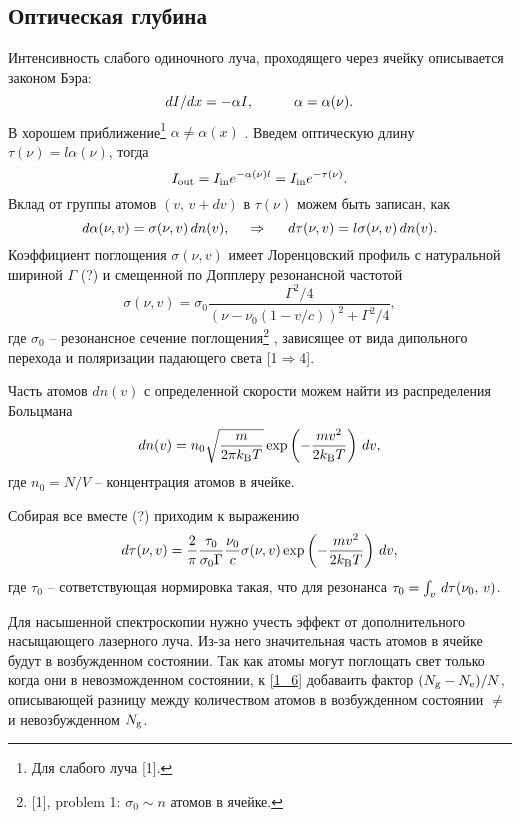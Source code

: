 \subsection{Оптическая глубина}


Интенсивность слабого одиночного луча, проходящего через ячейку описывается законом Бэра:
\begin{equation*}
    d I / d x = - \alpha I,
    \hspace{10 mm} 
    \alpha = \alpha (\nu).
\end{equation*}
В хорошем приближение\footnote{
    Для слабого луча [1].
}  $\alpha \neq \alpha(x)$ . 
Введем оптическую длину $\tau(\nu) = l \alpha(\nu)$, тогда
\begin{equation*}
    I_{\textnormal{out}} = I_{\textnormal{in}} e^{- \alpha(\nu) l} = I_{\textnormal{in}} e^{- \tau(\nu)}.
\end{equation*}
Вклад от группы атомов $(v,\, v + d v)$ в $\tau(\nu)$ можем быть записан, как
\begin{equation*}
    d \alpha (\nu, v) = \sigma(\nu, v) \, dn(v),
    \hspace{0.5cm} \Rightarrow \hspace{0.5cm}    
    d \tau(\nu, v) = l \sigma(\nu, v) \, dn(v).
\end{equation*}
Коэффициент поглощения $\sigma(\nu, v)$ имеет Лоренцовский профиль с натуральной шириной $\Gamma$ (?) и смещенной по Допплеру резонансной частотой
\begin{equation}
    \label{1_4}
    \sigma(\nu, v) = \sigma_0 \frac{\Gamma^2/4}{(\nu - \nu_0(1 - v / c))^2 + \Gamma^2/4},
\end{equation}
где $\sigma_0$ -- резонансное сечение поглощения\footnote{
    [1], problem 1: $\sigma_0 \sim n$ атомов в ячейке.
} , зависящее от вида дипольного перехода и поляризации падающего света [1$\Rightarrow$4]. 

Часть атомов $d n (v)$ с определенной скорости можем найти из распределения Больцмана
\begin{equation*}
    d n(v) = n_0 \sqrt{\frac{m}{2 \pi k_{\textnormal{B}} T}} \exp\left(
        - \frac{m v^2}{2 k_{\textnormal{B}} T} 
    \right) \, d v,
\end{equation*} 
где $n_0 = N/V$ -- концентрация атомов в ячейке. 

Собирая все вместе (?) приходим к выражению
\begin{equation}
    \label{1_6}
    d \tau (\nu, v) = \frac{2}{\pi} \frac{\tau_0}{\sigma_0 \Gamma} \frac{\nu_0}{c} 
     \sigma(\nu, v) \exp\left(
        - \frac{m v^2}{2 k_{\textnormal{B}} T}
     \right) \, d v,
\end{equation}
где $\tau_0$  -- сответствующая нормировка такая, что для резонанса $\tau_0 = \int_v \, d \tau (\nu_0,\, v)$.



Для насышенной спектроскопии нужно учесть эффект от дополнительного насыщающего лазерного луча. Из-за него значительная часть атомов в ячейке будут в возбужденном состоянии. Так как атомы могут поглощать свет только когда они в невозможденном состоянии, к \eqref{1_6} добаваить фактор $(N_{\textnormal{g}}-N_{\textnormal{e}})/N$, описывающей разницу 
между количеством атомов в возбужденном состоянии $\ne$ и невозбужденном $N_{\textnormal{g}}$. 

